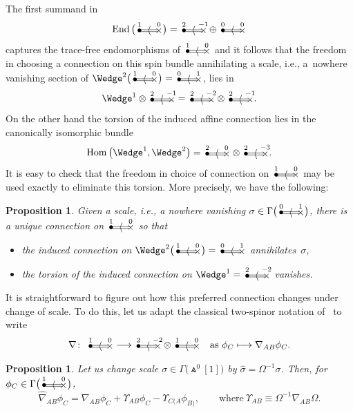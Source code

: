 \documentclass[10pt,a4paper]{amsart}
\numberwithin{equation}{section}
\newtheorem{prop}[Theorem]{Proposition}
 { \theoremstyle{definition}
\newtheorem{Definition}[Theorem]{Definition}
\newtheorem{Note}[Theorem]{Note}
\newtheorem{Example}[Theorem]{Example}
\newtheorem{Remark}[Theorem]{Remark} }
\newcommand{\Hom}{\operatorname{Hom}}
\newcommand{\End}{\operatorname{End}}
\newcommand{\btwo}[2]{\begin{picture}(28,11)
\put(4,1.5){\makebox(0,0){$\bullet$}}
\put(24,1.5){\makebox(0,0){$\times$}}
\put(23,2.5){\line(-1,0){20}}
\put(23,0.5){\line(-1,0){20}}
\put(14,1.5){\makebox(0,0){$\langle$}}
\put(4,8){\makebox(0,0){$\scriptstyle #1$}}
\put(24,8){\makebox(0,0){$\scriptstyle #2$}}
\end{picture}}
\begin{document}
The first summand in
\[\End\big(\btwo{1}{0}\big)=\btwo{2}{-1}\oplus\btwo{0}{0}\]
captures the trace-free endomorphisms of $\btwo{1}{0}$ and it follows that the
freedom in choosing a connection on this spin bundle annihilating a scale,
i.e., a~nowhere vanishing section of $\Wedge^2\big(\btwo{1}{0}\big)=\btwo{0}{1}$, lies
in
\[\Wedge^1\otimes\btwo{2}{-1}=\btwo{2}{-2}\otimes\btwo{2}{-1}.\]
On the other hand the torsion of the induced affine connection lies in
the canonically isomorphic bundle
\[\Hom\big({\Wedge}^1,\Wedge^2\big)=\btwo{2}{0}\otimes\btwo{2}{-3}.\]
It is easy to check that the freedom in choice of connection on $\btwo{1}{0}$
may be used exactly to eliminate this torsion. More precisely, we have the
following:
\begin{prop}\label{one} Given a scale, i.e., a nowhere vanishing
$\sigma\in\Gamma\big(\btwo{0}{1}\big)$, there is a unique connection on $\btwo{1}{0}$
so that
\begin{itemize}\itemsep=0pt
\item the induced connection on $\Wedge^2\big(\btwo{1}{0}\big)=\btwo{0}{1}$
annihilates~$\sigma$,
\item the torsion of the induced connection on $\Wedge^1=\btwo{2}{-2}$
vanishes.
\end{itemize}
\end{prop}
It is straightforward to figure out how this preferred connection changes under
change of scale. To do this, let us adapt the classical two-spinor notation
of~\cite{OT} to write
\[\nabla\colon \ \btwo{1}{0}\longrightarrow\btwo{2}{-2}\otimes\btwo{1}{0}
\quad\mbox{as} \ \phi_C\longmapsto\nabla_{AB}\phi_C.\]
\begin{prop}\label{two} Let us change scale $\sigma\in\Gamma\big({\Wedge}^0[1]\big)$ by
$\widehat\sigma=\Omega^{-1}\sigma$. Then, for $\phi_C\in\Gamma\big(\btwo{1}{0}\big)$,
\begin{equation}\label{change_of_spin_connection}
\widehat\nabla_{AB}\phi_C=\nabla_{AB}\phi_C+\Upsilon_{AB}\phi_C
-\Upsilon_{C(A}\phi_{B)},\qquad\mbox{where} \
\Upsilon_{AB}\equiv\Omega^{-1}\nabla_{AB}\Omega.\end{equation}
\end{prop}
\end{document}
